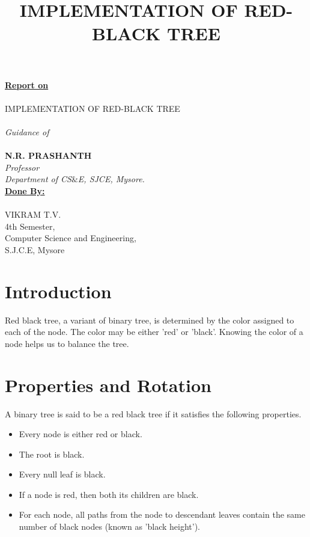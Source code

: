 \documentclass[11pt, oneside, a4paper]{article}
\begin{document}
\begin{center}
\textbf{\underline{Report on}}\\
\textsc{\\IMPLEMENTATION OF RED-BLACK TREE\\}
\emph{\\Guidance of}\\
\textbf{\\N.R. PRASHANTH}\\
\textit{Professor}\\
\textit{Department of CS$\&$E, SJCE, Mysore.}\\
\vspace{1in}
\textbf{\underline{Done By:}}\\
\textsc{\\VIKRAM T.V.}\\
4th Semester,\\ Computer Science and Engineering,\\
S.J.C.E, Mysore\\
\title {IMPLEMENTATION OF RED-BLACK TREE\\}
\end{center}
\newpage
\thispagestyle{empty}
\tableofcontents
\newpage
{}

\twocolumn
\section{Introduction}
Red black tree, a variant of binary tree, is determined by the color assigned to each of the node.  The color may be either 'red' or 'black'.  Knowing the color of a node helps us to balance the tree.

\section{Properties and Rotation}
A binary tree is said to be a red black tree if it satisfies the following properties.
\begin{itemize}
\item Every node is either red or black.
\item The root is black.
\item Every null leaf is black.
\item If a node is red, then both its children are black.
\item For each node, all paths from the node to descendant leaves contain the same number of black nodes (known as 'black height').
\end{itemize}
\end{document}
